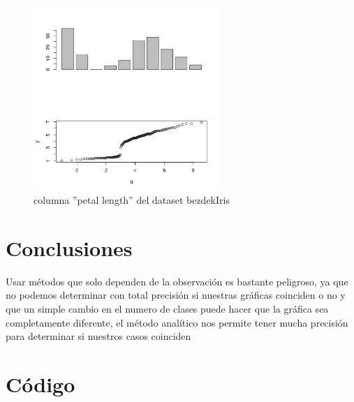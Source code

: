 \documentclass[10pt]{article}
\begin{document}
\begin{figure}[htbp]
\centering
\includegraphics[width=7cm]{img/i3.jpeg}
\caption{columna ''petal length'' del dataset bezdekIris}
\end{figure}

\section*{Conclusiones}
\label{sec:org7f4d2f7}
Usar métodos que solo dependen de la observación es bastante peligroso, ya que no podemos determinar con total precisión si nuestras gráficas coinciden o no y que un simple cambio en el numero de clases puede hacer que la gráfica sea completamente diferente, el método analítico nos permite tener mucha precisión para determinar si nuestros casos coinciden

\section*{Código}
\label{sec:orgedd47ae}

\end{document}
